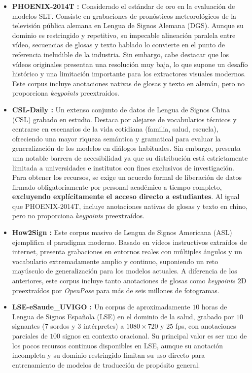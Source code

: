 \begin{itemize}
    \item \textbf{PHOENIX-2014T \cite{Phoenix}:} Considerado el estándar de oro en la evaluación de modelos SLT.
    Consiste en grabaciones de pronósticos meteorológicos de la televisión pública alemana en Lengua de Signos Alemana (DGS).
    Aunque su dominio es restringido y repetitivo, su impecable alineación paralela entre vídeo, secuencias de glosas y texto hablado lo convierte en el punto de referencia ineludible de la industria.
    Sin embargo, cabe destacar que los vídeos originales presentan una resolución muy baja, lo que supone un desafío histórico y una limitación importante para los extractores visuales modernos.
    Este corpus incluye anotaciones nativas de glosas y texto en alemán, pero no proporciona \textit{keypoints} preextraídos.

    \item \textbf{CSL-Daily \cite{CSL-Daily}:} Un extenso conjunto de datos de Lengua de Signos China (CSL) grabado en estudio.
    Destaca por alejarse de vocabularios técnicos y centrarse en escenarios de la vida cotidiana (familia, salud, escuela), ofreciendo una mayor riqueza semántica y gramatical para evaluar la generalización de los modelos en diálogos habituales.
    Sin embargo, presenta una notable barrera de accesibilidad ya que su distribución está estrictamente limitada a universidades e institutos con fines exclusivos de investigación.
    Para obtener los recursos, se exige un acuerdo formal de liberación de datos firmado obligatoriamente por personal académico a tiempo completo, \textbf{excluyendo explícitamente el acceso directo a estudiantes}.
    Al igual que PHOENIX-2014T, incluye anotaciones nativas de glosas y texto en chino, pero no proporciona \textit{keypoints} preextraídos.

    \item \textbf{How2Sign \cite{How2Sign}:} Este corpus masivo de Lengua de Signos Americana (ASL) ejemplifica el paradigma moderno.
    Basado en vídeos instructivos extraídos de internet, presenta grabaciones en entornos reales con múltiples ángulos y un vocabulario extremadamente amplio y continuo, suponiendo un reto mayúsculo de generalización para los modelos actuales.
    A diferencia de los anteriores, este corpus incluye tanto anotaciones de glosas como \textit{keypoints} $2$D preextraídos por \textit{OpenPose} para más de seis millones de fotogramas.

    \item \textbf{LSE-eSaude\_UVIGO \cite{docio2022eccv}:} Un corpus de aproximadamente $10$ horas de Lengua de Signos Española (LSE) en el dominio de la salud, grabado por $10$ signantes ($7$ sordos y $3$ intérpretes) a $1080\times720$ y $25$ fps, con anotaciones parciales de $100$ signos en contexto oracional.
    Su principal valor es ser uno de los pocos recursos continuos disponibles en LSE, aunque su anotación incompleta y su dominio restringido limitan su uso directo para entrenamiento de modelos de traducción de propósito general.


\end{itemize}
